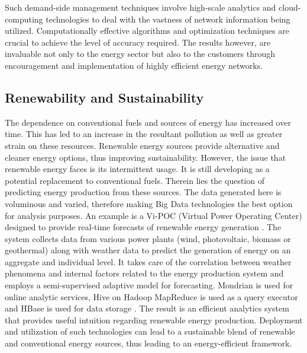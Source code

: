 Such demand-side management techniques involve high-scale analytics and cloud-computing technologies to deal with the vastness of network information being utilized. Computationally effective algorithms and optimization techniques are crucial to achieve the level of accuracy required. The results however, are invaluable not only to the energy sector but also to the customers through encouragement and implementation of highly efficient energy networks.

\subsection{Renewability and Sustainability}
The dependence on conventional fuels and sources of energy has increased over time. This has led to an increase in the resultant pollution as well as greater strain on these resources. Renewable energy sources provide alternative and cleaner energy options, thus improving sustainability. However, the issue that renewable energy faces is its intermittent usage. It is still developing as a potential replacement to conventional fuels. Therein lies the question of predicting  energy production from these sources. The data generated here is voluminous and varied, therefore making Big Data technologies the best option for analysis purposes. An example is a Vi-POC (Virtual Power Operating Center) designed to provide real-time forecasts of renewable energy generation \cite{mich16}. The system collects data from various power plants (wind, photovoltaic, biomass or geothermal)  along with weather data to predict the generation of energy on an aggregate and individual level. It takes care of the correlation between weather phenomena and internal factors related to the energy production system and employs a semi-supervised adaptive model for forecasting. Mondrian is used for online analytic services, Hive on Hadoop MapReduce is used as a query executor and HBase is used for data storage \cite{mich16}. The result is an efficient analytics system that provides useful intuition regarding renewable energy production. Deployment and utilization of such technologies can lead to a sustainable blend of  renewable and conventional energy sources, thus leading to an energy-efficient framework.

